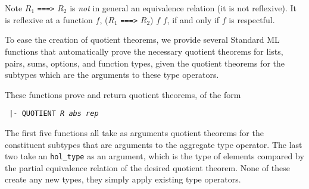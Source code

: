 \documentclass[envcountsame,runningheads]{llncs}
\newcommand{\quotient}{partial equivalence}
\begin{document}
Note $R_1$ {\tt ===>} $R_2$ is {\it not\/} in general an equivalence relation
(it is not reflexive).
It is reflexive at a function $f$,
($R_1$ {\tt ===>} $R_2$) $f$ $f$,
if and only if $f$ is respectful.


To ease the creation of quotient theorems,
we provide several Standard ML functions that automatically prove the 
necessary quotient theorems for lists, pairs, sums, options, and function types,
given the quotient theorems for the subtypes which are the arguments to
these type operators.

\begin{center}
\end{center}

These functions prove and return quotient theorems,
of the form
\begin{center}
\tt
|- QUOTIENT {\it R\/} {\it abs\/} {\it rep}
\end{center}
%
The first five functions all take as arguments quotient theorems
for the constituent subtypes that are arguments
to the aggregate type operator.  The last two take an {\tt hol\_type} as
an argument, which is the type of elements compared by the \quotient{} relation
of the desired quotient theorem.
None of these create any new types,
they simply apply existing type operators.
\end{document}

